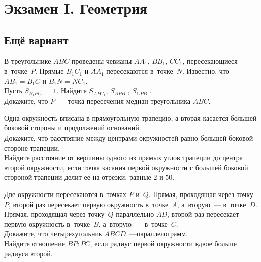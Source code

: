 
\section*{Экзамен I. Геометрия}


\subsection*{Ещё вариант}

\begin{problems}

\item
В треугольнике $ABC$ проведены чевианы $A A_1$, $B B_1$, $C C_1$,
пересекающиеся в~точке~$P$.
Прямые $B_1 C_1$ и $A A_1$ пересекаются в~точке~$N$.
Известно, что $A B_1 = B_1 C$ и $B_1 N = N C_1$.
\\
\subproblem
Пусть $S_{B_1 P C_1} = 1$.
Найдите $S_{A P C_1}$, $S_{A P B_1}$, $S_{C P B_1}$.
\\
\subproblem
Докажите, что $P$~--- точка пересечения медиан треугольника $ABC$.

\item
Одна окружность вписана в прямоугольную трапецию, а вторая касается большей
боковой стороны и продолжений оснований.
\\
\subproblem
Докажите, что расстояние между центрами окружностей равно большей боковой
стороне трапеции.
\\
\subproblem
Найдите расстояние от вершины одного из прямых углов трапеции до центра второй
окружности, если точка касания первой окружности с большей боковой стороной
трапеции делит ее на отрезки, равные $2$ и $50$.

\item
Две окружности пересекаются в~точках $P$ и~$Q$.
Прямая, проходящая через точку~$P$, второй раз пересекает первую окружность
в~точке~$A$, а~вторую~--- в~точке~$D$.
Прямая, проходящая через точку~$Q$ параллельно $AD$, второй раз пересекает
первую окружность в~точке~$B$, а~вторую~--- в~точке~$C$.
\\
\subproblem
Докажите, что четырехугольник $ABCD$~---параллелограмм.
\\
\subproblem
Найдите отношение $BP : PC$, если радиус первой окружности вдвое больше радиуса
второй.

\end{problems}

